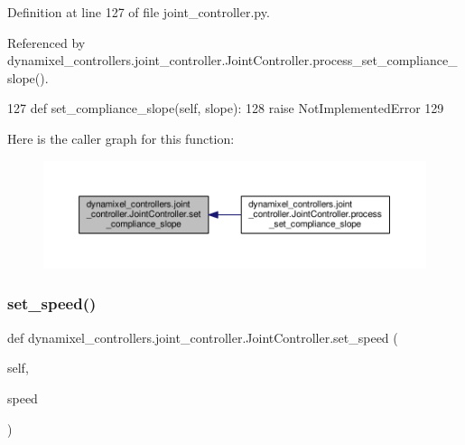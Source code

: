 Definition at line 127 of file joint\+\_\+controller.\+py.



Referenced by dynamixel\+\_\+controllers.\+joint\+\_\+controller.\+Joint\+Controller.\+process\+\_\+set\+\_\+compliance\+\_\+slope().


\begin{DoxyCode}
127     \textcolor{keyword}{def }set\_compliance\_slope(self, slope):
128         \textcolor{keywordflow}{raise} NotImplementedError
129 
\end{DoxyCode}
Here is the caller graph for this function\+:
\nopagebreak
\begin{figure}[H]
\begin{center}
\leavevmode
\includegraphics[width=350pt]{d3/dcd/classdynamixel__controllers_1_1joint__controller_1_1_joint_controller_a72508504f90f51b689d256d0dd3fc87b_icgraph}
\end{center}
\end{figure}
\mbox{\label{classdynamixel__controllers_1_1joint__controller_1_1_joint_controller_ae33e128897d20f659427e69e7f791a88}} 
\subsubsection{\texorpdfstring{set\+\_\+speed()}{set\_speed()}}
{\footnotesize\ttfamily def dynamixel\+\_\+controllers.\+joint\+\_\+controller.\+Joint\+Controller.\+set\+\_\+speed (\begin{DoxyParamCaption}\item[{}]{self,  }\item[{}]{speed }\end{DoxyParamCaption})}



